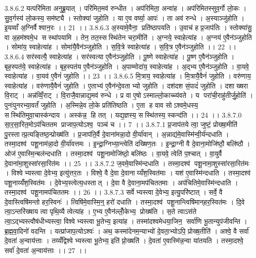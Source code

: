3.8.6.2
यत्परि॑मिता अनुब्रू॒यात् । परि॑मित॒मव॑ रुन्धीत । अप॑रिमिता॒ अन्वा॑ह । अप॑रिमितस्सुव॒र्गो लो॒कः । सु॒व॒र्गस्य॑ लो॒कस्य॒ सम॑ष्ट्यै । स्तोक्या॑ जुहोति । या ए॒व वर्ष्या॒ आपः॑ । ता अव॑ रुन्धे । अ॒स्याञ्जु॑होति । इ॒यव्वाँ अ॒ग्निर्वैश्वान॒रः ।। 21 ।।
3.8.6.3
अ॒स्यामे॒वैना॒ प्रति॑ष्ठापयति । उ॒वाच॑ ह प्र॒जाप॑तिः । स्तोक्या॑सु॒ वा अ॒हम॑श्वमे॒ध सस्था॑पयामि । तेन॒ तत॒स्सस्थि॑तेन चरा॒मीति॑ । अ॒ग्नये॒ स्वाहेत्या॑ह । अ॒ग्नय॑ ए॒वैन॑ञ्जुहोति । सोमा॑य॒ स्वाहेत्या॑ह । सोमा॑यै॒वैन॑ञ्जुहोति । स॒वि॒त्रे स्वाहेत्या॑ह । स॒वि॒त्र ए॒वैन॑ञ्जुहोति ।। 22 ।।
3.8.6.4
सर॑स्वत्यै॒ स्वाहेत्या॑ह । सर॑स्वत्या ए॒वैन॑ञ्जुहोति । पू॒ष्णे स्वाहेत्या॑ह । पू॒ष्ण ए॒वैन॑ञ्जुहोति । बृह॒स्पत॑ये॒ स्वाहेत्या॑ह । बृह॒स्पत॑य ए॒वैन॑ञ्जुहोति । अ॒पाम्मोदा॑य॒ स्वाहेत्या॑ह । अ॒द्भ्य ए॒वैन॑ञ्जुहोति । वा॒यवे॒ स्वाहेत्या॑ह । वा॒यव॑ ए॒वैनं॑ जुहोति ।। 23 ।।
3.8.6.5
मि॒त्राय॒ स्वाहेत्या॑ह । मि॒त्रायै॒वैनं॑ जुहोति । वरु॑णाय॒ स्वाहेत्या॑ह । वरु॑णायै॒वैनं॑ जुहोति । ए॒ताभ्य॑ ए॒वैन॑न्दे॒वताभ्यो जुहोति । दश॑दश सं॒पादं॑ जुहोति । दशाख्षरा वि॒राट् । अन्न॑व्विँ॒राट् । वि॒राजै॒वान्नाद्य॒मव॑ रुन्धे । प्र वा ए॒षोऽस्माल्लो॒काच्च्य॑वते । य परा॑ची॒राहु॑तीर्जु॒होति॑ । पुनः॑पुनरभ्या॒वर्तं॑ जुहोति । अ॒स्मिन्ने॒व लो॒के प्रति॑तिष्ठति । ए॒ता ह वाव सोऽश्वमे॒धस्य॒ सस्थि॑तिमुवा॒चास्क॑न्दाय । अस्क॑न्न॒ हि तत् । यद्य॒ज्ञस्य॒ सस्थि॑तस्य॒ स्कन्द॑ति ।। 24 ।।
3.8.7.0
सा॒र॒सा॒रित॒मोऽप॑चिततम प्राजाप॒त्योऽश्व॒ पञ्च॑ च ।। 7 ।।
3.8.7.1
प्र॒जाप॑तये त्वा॒ जुष्टं॒ प्रोख्षा॒मीति॑ पु॒रस्तात्प्र॒त्यङ्तिष्ठ॒न्प्रोख्ष॑ति । प्र॒जाप॑ति॒र्वै दे॒वाना॑मन्ना॒दो वी॒र्या॑वान् । अ॒न्नाद्य॑मे॒वास्मि॑न्वी॒र्य॑न्दधाति । तस्मा॒दश्व॑ पशू॒नाम॑न्ना॒दो वी॒र्या॑वत्तमः । इ॒न्द्रा॒ग्निभ्या॒न्त्वेति॑ दख्षिण॒तः । इ॒न्द्रा॒ग्नी वै दे॒वाना॒मोजि॑ष्ठौ॒ बलि॑ष्ठौ । ओज॑ ए॒वास्मि॒न्बल॑न्दधाति । तस्मा॒दश्व॑ पशू॒नामोजि॑ष्ठो॒ बलि॑ष्ठः । वा॒यवे॒ त्वेति॑ प॒श्चात् । वा॒युर्वै दे॒वाना॑मा॒शुस्सा॑रसा॒रित॑मः ।। 25 ।।
3.8.7.2
ज॒वमे॒वास्मि॑न्दधाति । तस्मा॒दश्व॑ पशू॒नामा॒शुस्सा॑रसा॒रित॑मः । विश्वेभ्यस्त्वा दे॒वेभ्य॒ इत्यु॑त्तर॒तः । विश्वे॒ वै दे॒वा दे॒वानाय्यँश॒स्वित॑माः । यश॑ ए॒वास्मि॑न्दधाति । तस्मा॒दश्व॑ पशू॒नाय्यँ॑श॒स्वित॑मः । दे॒वेभ्य॒स्त्वेत्य॒धस्तात् । दे॒वा वै दे॒वाना॒मप॑चिततमाः । अप॑चितिमे॒वास्मि॑न्दधाति । तस्मा॒दश्व॑ पशू॒नामप॑चिततमः ।। 26 ।।
3.8.7.3
सर्वेभ्यस्त्वा दे॒वेभ्य॒ इत्यु॒परि॑ष्टात् । सर्वे॒ वै दे॒वास्त्विषि॑मन्तो हर॒स्विनः॑ । त्विषि॑मे॒वास्मि॒न्॒ हरो॑ दधाति । तस्मा॒दश्व॑ पशू॒नान्त्विषि॑मान्‌हर॒स्वित॑मः । दि॒वे त्वा॒ऽन्तरि॑ख्षाय त्वा पृथि॒व्यै त्वेत्या॑ह । ए॒भ्य ए॒वैन॑ल्लोँ॒केभ्य॒ प्रोख्ष॑ति । स॒ते त्वाऽस॑ते त्वा॒ऽद्भ्यस्त्वौष॑धीभ्यस्त्वा॒ विश्वेभ्यस्त्वा भू॒तेभ्य॒ इत्या॑ह । तस्मा॑दश्वमेधया॒जिन॒॒ सर्वा॑णि भू॒तान्युप॑जीवन्ति । ब्र॒ह्म॒वा॒दिनो॑ वदन्ति । यत्प्रा॑जाप॒त्योऽश्वः॑ । अथ॒ कस्मा॑देनम॒न्याभ्यो॑ दे॒वता॒भ्योऽपि॒ प्रोख्ष॒तीति॑ । अश्वे॒ वै सर्वा॑ दे॒वता॑ अ॒न्वाय॑त्ताः । तय्यँद्विश्वेभ्यस्त्वा भू॒तेभ्य॒ इति॑ प्रो॒ख्षति॑ । दे॒वता॑ ए॒वास्मि॑न्न॒न्वा या॑तयति । तस्मा॒दश्वे॒ सर्वा॑ दे॒वता॑ अ॒न्वाय॑त्ताः ।। 27 ।।
